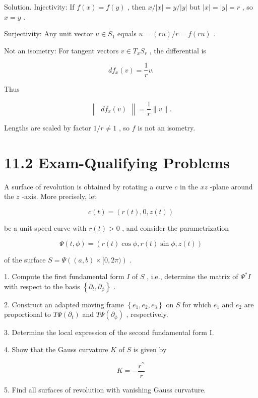 \documentclass[10pt]{article}
\begin{document}
Solution. Injectivity: If \(f\left( x\right)  = f\left( y\right)\) , then \(x/\left| x\right|  = y/\left| y\right|\) but \(\left| x\right|  = \left| y\right|  = r\) , so \(x = y\) .

Surjectivity: Any unit vector \(u \in  {S}_{1}\) equals \(u = \left( {ru}\right) /r = f\left( {ru}\right)\) .

Not an isometry: For tangent vectors \(v \in  {T}_{x}{S}_{r}\) , the differential is

\[
d{f}_{x}\left( v\right)  = \frac{1}{r}v.
\]

Thus

\[
\begin{Vmatrix}{d{f}_{x}\left( v\right) }\end{Vmatrix} = \frac{1}{r}\parallel v\parallel .
\]

Lengths are scaled by factor \(1/r \neq  1\) , so \(f\) is not an isometry.

\section*{11.2 Exam-Qualifying Problems}

\begin{problem}[title=PROBLEM 4 (10 POINTS)]
A surface of revolution is obtained by rotating a curve \(c\) in the \({xz}\) -plane around the \(z\) -axis. More precisely, let

\[
c\left( t\right)  = \left( {r\left( t\right) ,0,z\left( t\right) }\right)
\]

be a unit-speed curve with \(r\left( t\right)  > 0\) , and consider the parametrization

\[
\Psi \left( {t,\phi }\right)  = \left( {r\left( t\right) \cos \phi ,r\left( t\right) \sin \phi ,z\left( t\right) }\right)
\]

of the surface \(S = \Psi \left( {\left( {a,b}\right)  \times  \lbrack 0,{2\pi })}\right)\) .

1. Compute the first fundamental form \(I\) of \(S\) , i.e., determine the matrix of \({\Psi }^{ * }I\) with respect to the basis \(\left\{  {{\partial }_{t},{\partial }_{\phi }}\right\}\) .

2. Construct an adapted moving frame \(\left\{  {{e}_{1},{e}_{2},{e}_{3}}\right\}\) on \(S\) for which \({e}_{1}\) and \({e}_{2}\) are proportional to \({T\Psi }\left( {\partial }_{t}\right)\) and \({T\Psi }\left( {\partial }_{\phi }\right)\) , respectively.

3. Determine the local expression of the second fundamental form I.

4. Show that the Gauss curvature \(K\) of \(S\) is given by

\[
K =  - \frac{{r}^{\prime \prime }}{r}
\]

5. Find all surfaces of revolution with vanishing Gauss curvature.
\end{problem}
\end{document}
